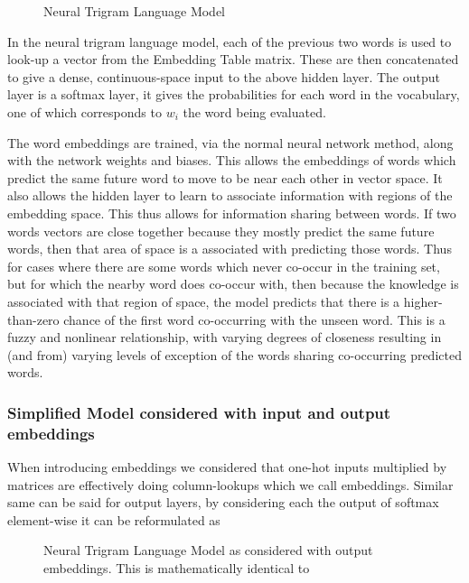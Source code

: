 \documentclass[parskip]{komatufte}
\begin{document}
\begin{figure}
	\centering
	 
	\caption{\label{fig:trigram-neural-language-model} Neural Trigram Language Model}
\end{figure}

In the neural trigram language model, each of the previous two words is used to look-up a vector from the Embedding Table matrix.
These are then concatenated to give a dense, continuous-space input to the above hidden layer.
The output layer is a softmax layer, it gives the probabilities for each word in the vocabulary, one of which corresponds to $w_i$ the word being evaluated.

The word embeddings are trained, via the normal neural network method, along with the network weights and biases.
This allows the embeddings of words which predict the same future word to move to be near each other in vector space.
It also allows the hidden layer to learn to associate information with regions of the embedding space.
This thus allows for information sharing between words.
If two words vectors are close together because they mostly predict the same future words, then that area of space is a associated with predicting those words.
Thus for cases where there are some words which never co-occur in the training set, but for which the nearby word does co-occur with, then because the knowledge is associated with that region of space, the model predicts that there is a higher-than-zero chance of the first word co-occurring with the unseen word.
This is a fuzzy and nonlinear relationship, with varying degrees of closeness resulting in (and from) varying levels of exception of the words sharing co-occurring predicted words.

\subsubsection{Simplified Model considered with input and output embeddings}
When introducing embeddings we considered that one-hot inputs multiplied by matrices
are effectively doing column-lookups which we call embeddings.
Similar same can be said for output layers,
by considering each the output of softmax element-wise it can be reformulated as
\begin{figure}
	\centering
	\caption{\label{fig:trigram-adv-neural-language-model} Neural Trigram Language Model as considered with output embeddings. This is mathematically identical to }
	 
\end{figure}
\end{document}
